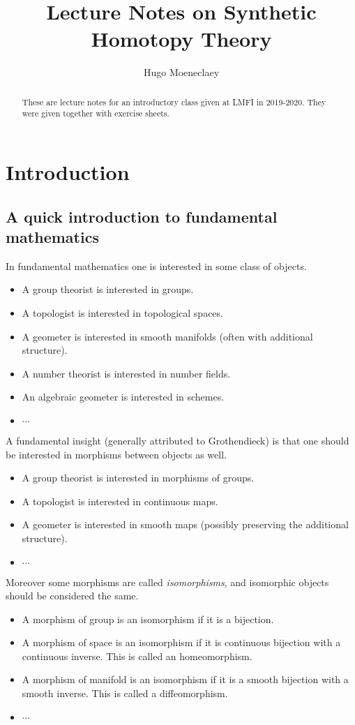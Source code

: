 \documentclass{article}
\title{Lecture Notes on Synthetic Homotopy Theory}
\author{Hugo Moeneclaey}
\date{}
\newcommand{\se}[1]{\medbreak \medbreak \section{#1}}
\newcommand{\sse}[1]{\medbreak \subsection{#1}}
\begin{document}
\maketitle

\begin{abstract}
These are lecture notes for an introductory class given at LMFI in 2019-2020. They were given together with exercise sheets.
\end{abstract}

\tableofcontents


\se{Introduction}

\sse{A quick introduction to fundamental mathematics}

In fundamental mathematics one is interested in some class of objects.

\begin{itemize}
\item A group theorist is interested in groups.
\item A topologist is interested in topological spaces.
\item A geometer is interested in smooth manifolds (often with additional structure).
\item A number theorist is interested in number fields.
\item An algebraic geometer is interested in schemes.
\item $\cdots$
\end{itemize}

A fundamental insight (generally attributed to Grothendieck) is that one should be interested in morphisms between objects as well.

\begin{itemize}
\item A group theorist is interested in morphisms of groups.
\item A topologist is interested in continuous maps.
\item A geometer is interested in smooth maps (possibly preserving the additional structure).
\item $\cdots$
\end{itemize}

Moreover some morphisms are called \emph{isomorphisms}, and isomorphic objects should be considered the same.

\begin{itemize}
\item A morphism of group is an isomorphism if it is a bijection.
\item A morphism of space is an isomorphism if it is continuous bijection with a continuous inverse. This is called an homeomorphism.
\item A morphism of manifold is an isomorphism if it is a smooth bijection with a smooth inverse. This is called a diffeomorphism.
\item $\cdots$
\end{itemize}
\end{document}
